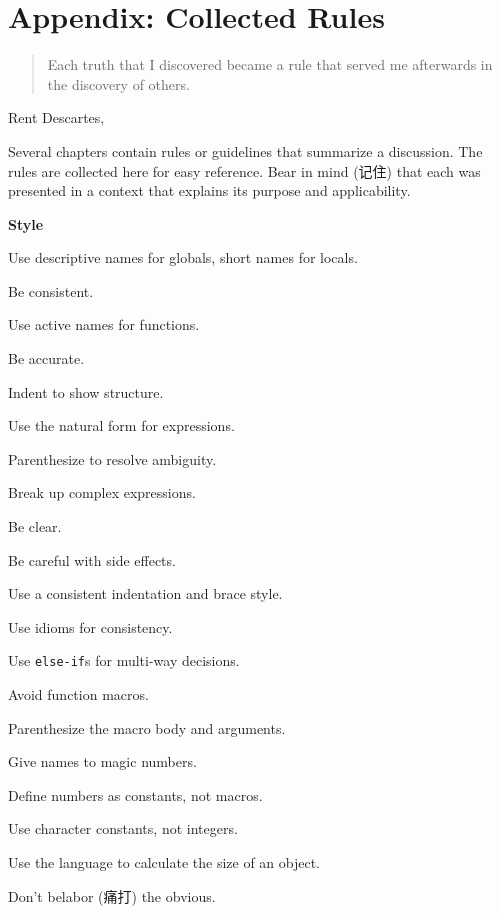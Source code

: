 \chapter{Appendix: Collected Rules}
\label{chap:appendix_collected_rules}

\begin{quote}
Each truth that I discovered became a rule that served me afterwards in the
discovery of others.
\end{quote}

\begin{quotesrc}
    Rent Descartes, 
\end{quotesrc}

Several chapters contain rules or guidelines that summarize a discussion.
The rules are collected here for easy reference. Bear in mind (记住) that
each was presented in a context that explains its purpose and
applicability.

{\Large\textbf{Style}}
\begin{myitemize}
\item Use descriptive names for globals, short names for locals.
\item Be consistent.
\item Use active names for functions.
\item Be accurate.
\item Indent to show structure.
\item Use the natural form for expressions.
\item Parenthesize to resolve ambiguity.
\item Break up complex expressions.
\item Be clear.
\item Be careful with side effects.
\item Use a consistent indentation and brace style.
\item Use idioms for consistency.
\item Use \verb'else-if's for multi-way decisions.
\item Avoid function macros.
\item Parenthesize the macro body and arguments.
\item Give names to magic numbers.
\item Define numbers as constants, not macros.
\item Use character constants, not integers.
\item Use the language to calculate the size of an object.
\item Don't belabor (痛打) the obvious.
\end{myitemize}

